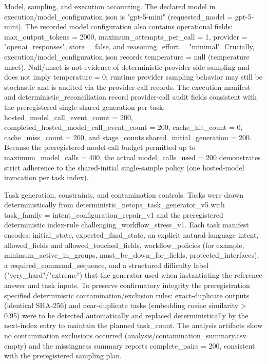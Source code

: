 \documentclass[conference]{IEEEtran}
\begin{document}
Model, sampling, and execution accounting. The declared model in execution/model\_configuration.json is "gpt-5-mini" (requested\_model = gpt-5-mini). The recorded model configuration also contains operational fields: max\_output\_tokens = 2000, maximum\_attempts\_per\_call = 1, provider = "openai\_responses", store = false, and reasoning\_effort = "minimal". Crucially, execution/model\_configuration.json records temperature = null (temperature unset). Null/unset is not evidence of deterministic provider-side sampling and does not imply temperature = 0; runtime provider sampling behavior may still be stochastic and is audited via the provider-call records. The execution manifest and deterministic\_reconciliation record provider-call audit fields consistent with the preregistered single shared generation per task: hosted\_model\_call\_event\_count = 200, completed\_hosted\_model\_call\_event\_count = 200, cache\_hit\_count = 0, cache\_miss\_count = 200, and stage\_counts.shared\_initial\_generation = 200. Because the preregistered model-call budget permitted up to maximum\_model\_calls = 400, the actual model\_calls\_used = 200 demonstrates strict adherence to the shared-initial single-sample policy (one hosted-model invocation per task index).

Task generation, constraints, and contamination controls. Tasks were drawn deterministically from deterministic\_netops\_task\_generator\_v5 with task\_family = intent\_configuration\_repair\_v1 and the preregistered deterministic index-rule challenging\_workflow\_stress\_v1. Each task manifest encodes: initial\_state, expected\_final\_state, an explicit natural-language intent, allowed\_fields and allowed\_touched\_fields, workflow\_policies (for example, minimum\_active\_in\_groups, must\_be\_down\_for\_fields, protected\_interfaces), a required\_command\_sequence, and a structured difficulty label ("very\_hard"/"extreme") that the generator used when instantiating the reference answer and task inputs. To preserve confirmatory integrity the preregistration specified deterministic contamination/exclusion rules: exact-duplicate outputs (identical SHA-256) and near-duplicate tasks (embedding cosine similarity > 0.95) were to be detected automatically and replaced deterministically by the next-index entry to maintain the planned task\_count. The analysis artifacts show no contamination exclusions occurred (analysis/contamination\_summary.csv empty) and the missingness summary reports complete\_pairs = 200, consistent with the preregistered sampling plan.
\end{document}
